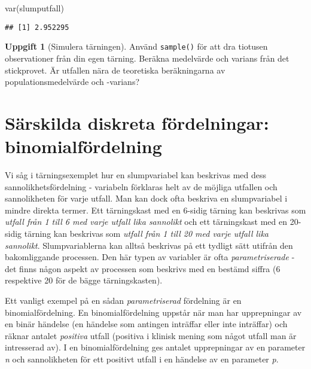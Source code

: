 \documentclass[
]{book}
\newenvironment{Shaded}{\begin{snugshade}}{\end{snugshade}}
\newcommand{\FunctionTok}[1]{\textcolor[rgb]{0.00,0.00,0.00}{#1}}
\newcommand{\NormalTok}[1]{#1}
\theoremstyle{definition}
\theoremstyle{definition}
\theoremstyle{definition}
\newtheorem{exercise}{Uppgift}[chapter]
\theoremstyle{definition}
\theoremstyle{remark}
\begin{document}
\begin{Shaded}
\begin{Highlighting}[]
\FunctionTok{var}\NormalTok{(slumputfall)}
\end{Highlighting}
\end{Shaded}

\begin{verbatim}
## [1] 2.952295
\end{verbatim}

\begin{exercise}[Simulera tärningen]
Använd \texttt{sample()} för att dra tiotusen observationer från din egen tärning. Beräkna medelvärde och varians från det stickprovet. Är utfallen nära de teoretiska beräkningarna av populationsmedelvärde och -varians?
\end{exercise}

\hypertarget{suxe4rskilda-diskreta-fuxf6rdelningar-binomialfuxf6rdelning}{%
\section{Särskilda diskreta fördelningar: binomialfördelning}\label{suxe4rskilda-diskreta-fuxf6rdelningar-binomialfuxf6rdelning}}

Vi såg i tärningsexemplet hur en slumpvariabel kan beskrivas med dess sannolikhetsfördelning - variabeln förklaras helt av de möjliga utfallen och sannolikheten för varje utfall. Man kan dock ofta beskriva en slumpvariabel i mindre direkta termer. Ett tärningskast med en 6-sidig tärning kan beskrivas som \emph{utfall från 1 till 6 med varje utfall lika sannolikt} och ett tärningskast med en 20-sidig tärning kan beskrivas som \emph{utfall från 1 till 20 med varje utfall lika sannolikt}. Slumpvariablerna kan alltså beskrivas på ett tydligt sätt utifrån den bakomliggande processen. Den här typen av variabler är ofta \emph{parametriserade} - det finns någon aspekt av processen som beskrivs med en bestämd siffra (6 respektive 20 för de bägge tärningskasten).

Ett vanligt exempel på en sådan \emph{parametriserad} fördelning är en binomialfördelning. En binomialfördelning uppstår när man har upprepningar av en binär händelse (en händelse som antingen inträffar eller inte inträffar) och räknar antalet \emph{positiva} utfall (positiva i klinisk mening som något utfall man är intresserad av). I en binomialfördelning ges antalet upprepningar av en parameter \emph{n} och sannolikheten för ett positivt utfall i en händelse av en parameter \emph{p}.
\end{document}

